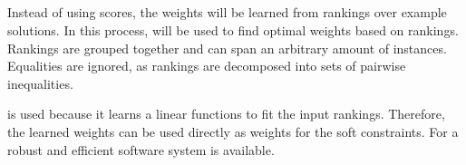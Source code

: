 \subsection{\svm}
\label{sec:svm}
Instead of using scores, the weights will be learned from rankings over example solutions.
In this process, \svm{} \cite{joachims2002optimizing} will be used to find optimal weights based on rankings.
Rankings are grouped together and can span an arbitrary amount of instances.
Equalities are ignored, as rankings are decomposed into sets of pairwise inequalities.

\svm{} is used because it learns a linear functions to fit the input rankings.
Therefore, the learned weights can be used directly as weights for the soft constraints.
For \svm{} a robust and efficient software system is available.